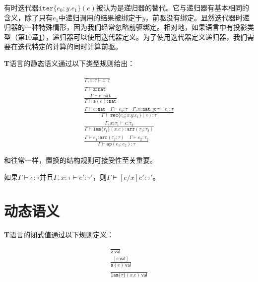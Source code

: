 有时迭代器$\mathtt{iter}\{e_0;y.e_1\}(e)$被认为是递归器的替代。它与递归器有基本相同的含义，除了只有$e_1$中递归调用的结果被绑定于$y$，前驱没有绑定。显然迭代器时递归器的一种特殊情形，因为我们经常忽略前驱绑定。相对地，如果语言中有投影类型（第10章\ref{}），递归器可以使用迭代器定义。为了使用迭代器定义递归器，我们需要在迭代特定的计算的同时计算前驱。

\textbf{T}语言的静态语义通过以下类型规则给出：

\begin{subequations}
\begin{gather}
\frac{}{\Gamma,x:\tau\vdash x:\tau}\\
\frac{}{\Gamma\vdash\mathtt{z}:\mathtt{nat}}\\
\frac{\Gamma\vdash e:\mathtt{nat}}{\Gamma \vdash \mathtt{s}(e):\mathtt{nat}}\\
\frac{\Gamma \vdash e:\mathtt{nat}\quad\Gamma\vdash e_0:\tau\quad\Gamma,x:\mathtt{nat},y:\tau\vdash e_1:\tau}{\Gamma\vdash\mathtt{rec}\{e_0;x.y.e_1\}(e):\tau}\\
\frac{\Gamma,x:\tau_1\vdash e:\tau_2}{\Gamma\vdash\mathtt{lam}\{\tau_1\}(x.e):\mathtt{arr}(\tau_1;\tau_2)}\\
\frac{\Gamma\vdash e_1:\mathtt{arr}(\tau_2;\tau)\quad\Gamma\vdash e_2:\tau_2}{\Gamma\vdash\mathtt{ap}(e_1;e_2):\tau}
\end{gather}
\end{subequations}

和往常一样，置换的结构规则可接受性至关重要。

\begin{lemma}
如果$\Gamma\vdash e:\tau$并且$\Gamma,x:\tau\vdash e':\tau'$，则$\Gamma\vdash[e/x]e':\tau'$。
\end{lemma}

\section{动态语义}
\textbf{T}语言的闭式值通过以下规则定义：

\begin{subequations}
\begin{gather}
\frac{}{\mathtt{z}\ \mathsf{val}}\\
\frac{[e\ \mathsf{val}]}{\mathtt{s}(e)\ \mathsf{val}}\label{equ:T-value-successor}\\
\frac{}{\mathtt{lam}\{\tau\}(x.e)\ \mathsf{val}}
\end{gather}
\end{subequations}


